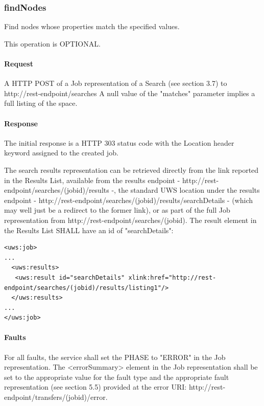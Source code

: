 \documentclass[11pt,a4paper]{ivoa}
\begin{document}
\subsubsection{findNodes}
Find nodes whose properties match the specified values.

This operation is OPTIONAL.

\paragraph{Request}
A HTTP POST of a Job representation of a Search (see section 3.7) to http://rest-endpoint/searches
A null value of the "matches" parameter implies a full listing of the space.

\paragraph{Response}
The initial response is a HTTP 303 status code with the Location header keyword assigned to the created job.

The search results representation can be retrieved directly from the link reported in the Results List, available from the results endpoint - http://rest-endpoint/searches/(jobid)/results -, the standard UWS location under the results endpoint - http://rest-endpoint/searches/(jobid)/results/searchDetails - (which may well just be a redirect to the former link), or as part of the full Job representation from http://rest-endpoint/searches/(jobid). The result element in the Results List SHALL have an id of "searchDetails":

\begin{lstlisting}
<uws:job>
...
  <uws:results>
   <uws:result id="searchDetails" xlink:href="http://rest-endpoint/searches/(jobid)/results/listing1"/>
  </uws:results>
...
</uws:job>
\end{lstlisting}

\paragraph{Faults}
For all faults, the service shall set the PHASE to "ERROR" in the Job representation. The <errorSummary> element in the Job representation shall be set to the appropriate value for the fault type and the appropriate fault representation (see section 5.5) provided at the error URI: http://rest-endpoint/transfers/(jobid)/error.
\end{document}
